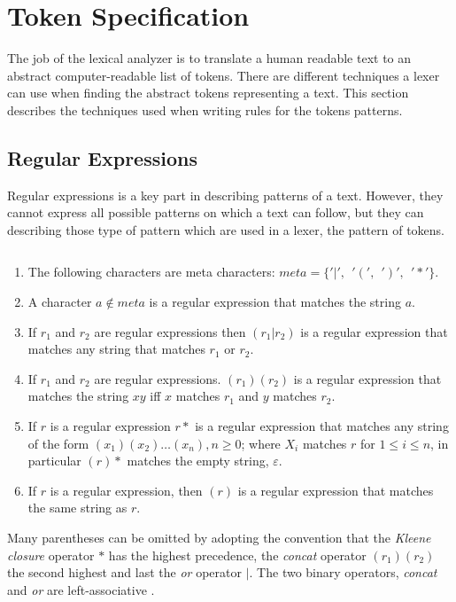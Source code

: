 \section{Token Specification}
The job of the lexical analyzer is to translate a human readable text to an
abstract computer-readable list of tokens. There are different techniques a
lexer can use when finding the abstract tokens representing a text. This section
describes the techniques used when writing rules for the tokens patterns.

\subsection{Regular Expressions}
Regular expressions is a key part in describing patterns of a text. However,
they cannot express all possible patterns on which a text can follow, but they
can describing those type of pattern which are used in a lexer, the pattern of
tokens.

\begin{definition}\label{regexp} $ $\\
\begin{enumerate}
  \item The following characters are meta characters: $meta = \{ '|', ~~ '(', ~~ ')', ~~ '*' \}$.
  \item A character $a \notin meta$ is a regular expression that matches the 
      string $a$.
  \item If $r_1$ and $r_2$ are regular expressions then $(r_1 | r_2)$ is a 
      regular expression that matches any string that matches $r_1$ or $r_2$.
  \item If $r_1$ and $r_2$ are regular expressions. $(r_1)(r_2)$ is a regular
      expression that matches the string $xy$ iff $x$ matches $r_1$
      and $y$ matches $r_2$.
  \item If $r$ is a regular expression $r*$ is a regular expression that
      matches any string of the form $(x_1)(x_2) \dots  (x_n), n \geq 0$;
      where $X_i$ matches $r$ for $1 \leq i \leq n$, in particular $(r)*$ 
      matches the empty string, $\varepsilon$.
  \item If $r$ is a regular expression, then $(r)$ is a regular expression that
      matches the same string as $r$.
\end{enumerate}
\qeda
\end{definition}

Many parentheses can be omitted by adopting the convention that the \emph{Kleene
closure} operator $*$ has the highest precedence, the \emph{concat} operator
$(r_1)(r_2)$ the second highest and last the \emph{or} operator $|$. The two
binary operators, \emph{concat} and \emph{or} are left-associative \cite{Aho1990}.


